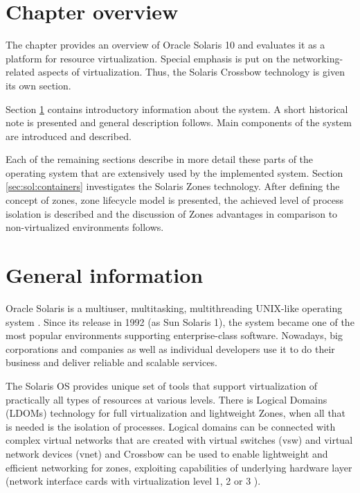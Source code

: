 \documentclass[11pt]{book}
\begin{document}
    \section*{Chapter overview}

      The chapter provides an overview of Oracle Solaris 10 and evaluates it as a platform for resource virtualization.
      Special emphasis is put on the networking-related aspects of virtualization. Thus, the Solaris Crossbow technology
      is given its own section.

      Section \ref{sec:sol:general} contains introductory information about the system. A short historical note is
      presented and general description follows. Main components of the system are introduced and described.
      
      Each of the remaining sections describe in more detail these parts of the operating system that are extensively
      used by the implemented system. Section \ref{sec:sol:containers} investigates the Solaris Zones technology. After
      defining the concept of zones, zone lifecycle model is presented, the achieved level of process isolation
      is described and the discussion of Zones advantages in comparison to non-virtualized environments follows.



    \section{General information}
    \label{sec:sol:general}

      Oracle Solaris is a multiuser, multitasking, multithreading UNIX-like operating system \cite{reference}. Since its
      release in 1992 (as Sun Solaris 1), the system became one of the most popular environments supporting
      enterprise-class software. Nowadays, big corporations and companies as well as individual developers use it to do
      their business and deliver reliable and scalable services.

      The Solaris OS provides unique set of tools that support virtualization of practically all types of resources at
      various levels. There is Logical Domains (LDOMs) technology for full virtualization and lightweight Zones, when
      all that is needed is the isolation of processes. Logical domains can be connected with complex virtual networks
      that are created with virtual switches (vsw) and virtual network devices (vnet) \cite{ldomag} and Crossbow can be used to enable lightweight and
      efficient networking for zones, exploiting capabilities of underlying hardware layer (network interface cards with
      virtualization level 1, 2 or 3 \cite{santos}).
\end{document}
